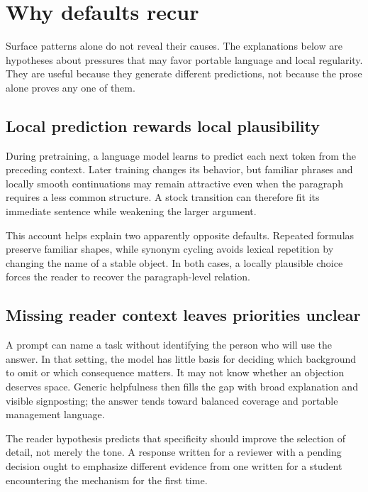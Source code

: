 \section{Why defaults recur}
\label{sec:hypotheses}

Surface patterns alone do not reveal their causes. The explanations below are
hypotheses about pressures that may favor portable language and local
regularity. They are useful because they generate different predictions, not
because the prose alone proves any one of them.

\subsection{Local prediction rewards local plausibility}

During pretraining, a language model learns to predict each next token from the
preceding context. Later training changes its behavior, but familiar phrases
and locally smooth continuations may remain attractive even when the paragraph
requires a less common structure. A stock transition can therefore fit its
immediate sentence while weakening the larger argument.

This account helps explain two apparently opposite defaults. Repeated formulas
preserve familiar shapes, while synonym cycling avoids lexical repetition by
changing the name of a stable object. In both cases, a locally plausible choice
forces the reader to recover the paragraph-level relation.

\subsection{Missing reader context leaves priorities unclear}

A prompt can name a task without identifying the person who will use the
answer. In that setting, the model has little basis for deciding which
background to omit or which consequence matters. It may not know whether an
objection deserves space. Generic helpfulness then fills the gap with broad
explanation and visible signposting; the answer tends toward balanced coverage
and portable management language.

The reader hypothesis predicts that specificity should improve the selection
of detail, not merely the tone. A response written for a reviewer with a
pending decision ought to emphasize different evidence from one written for a
student encountering the mechanism for the first time.

